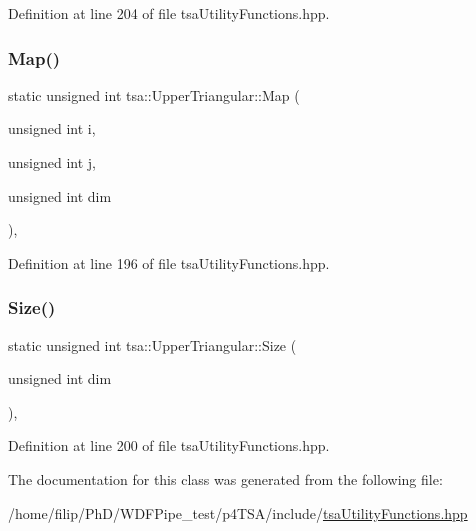 Definition at line 204 of file tsa\+Utility\+Functions.\+hpp.

\mbox{\label{classtsa_1_1_upper_triangular_a5f1438749cd68c2d37bdab3746fdc89a}} 
\subsubsection{\texorpdfstring{Map()}{Map()}}
{\footnotesize\ttfamily static unsigned int tsa\+::\+Upper\+Triangular\+::\+Map (\begin{DoxyParamCaption}\item[{unsigned int}]{i,  }\item[{unsigned int}]{j,  }\item[{unsigned int}]{dim }\end{DoxyParamCaption})\hspace{0.3cm}{\ttfamily [inline]}, {\ttfamily [static]}}



Definition at line 196 of file tsa\+Utility\+Functions.\+hpp.

\mbox{\label{classtsa_1_1_upper_triangular_ae7dd3b19c6587107501dcdda9276e581}} 
\subsubsection{\texorpdfstring{Size()}{Size()}}
{\footnotesize\ttfamily static unsigned int tsa\+::\+Upper\+Triangular\+::\+Size (\begin{DoxyParamCaption}\item[{unsigned int}]{dim }\end{DoxyParamCaption})\hspace{0.3cm}{\ttfamily [inline]}, {\ttfamily [static]}}



Definition at line 200 of file tsa\+Utility\+Functions.\+hpp.



The documentation for this class was generated from the following file\+:\begin{DoxyCompactItemize}
\item 
/home/filip/\+Ph\+D/\+W\+D\+F\+Pipe\+\_\+test/p4\+T\+S\+A/include/\hyperlink{tsa_utility_functions_8hpp}{tsa\+Utility\+Functions.\+hpp}\end{DoxyCompactItemize}
